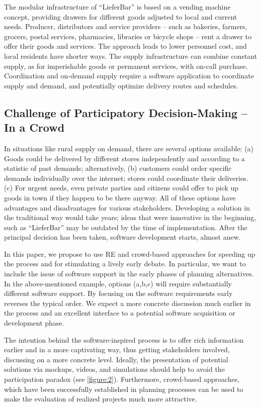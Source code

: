 \documentclass[conference]{IEEEtran}
\begin{document}
The modular infrastructure of ``LieferBar'' is based on a vending machine 
concept, providing drawers for different goods adjusted to local and current 
needs. Producer, distributors and service providers – such as bakeries, 
farmers, grocers, postal services, pharmacies, libraries or bicycle shops – 
rent a drawer to offer their goods and services. The approach leads to lower 
personnel cost, and local residents have shorter ways. The supply 
infrastructure can combine constant supply, as for imperishable goods or 
permanent services, with on-call purchase. Coordination and on-demand supply 
require a software application to coordinate supply and demand, and potentially 
optimize delivery routes and schedules.

\subsection{Challenge of Participatory Decision-Making -- In a Crowd}
In situations like rural supply on demand, there are several options available: 
(a) Goods could be delivered by different stores independently and according to 
a statistic of past demands; alternatively, (b) customers could order specific 
demands individually over the internet; stores could coordinate their 
deliveries. (c) For urgent needs, even private parties and citizens could offer 
to pick up goods in town if they happen to be there anyway. All of these 
options have advantages and disadvantages for various stakeholders. Developing 
a solution in the traditional way would take years; ideas that were innovative 
in the beginning, such as ``LieferBar'' may be outdated by the time of 
implementation. After the principal decision has been taken, software 
development starts, almost anew.

In this paper, we propose to use RE and crowd-based approaches for speeding up 
the process and for stimulating a lively early debate. In particular, we want 
to include the issue of software support in the early phases of planning 
alternatives. In the above-mentioned example, options (a,b,c) will require 
substantially different software support. By focusing on the software 
requirements early reverses the typical order. We expect a more concrete 
discussion much earlier in the process and an excellent interface to a 
potential software acquisition or development phase.

The intention behind the software-inspired process is to offer rich 
information earlier and in a more captivating way, thus getting stakeholders 
involved, discussing on a more concrete level. Ideally, the presentation of 
potential solutions via mockups, videos, and simulations should help to avoid 
the participation paradox (see \figurename{ \ref{figure:2}}). Furthermore, 
crowd-based approaches, which have been successfully established in planning 
processes can be used to make the evaluation of realized projects much more 
attractive.
\end{document}
